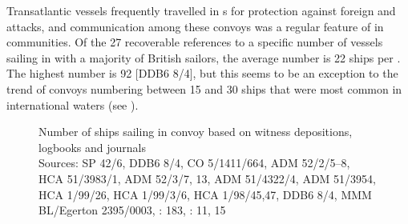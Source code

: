 Transatlantic vessels frequently travelled in s for protection against foreign and  attacks, and communication among these convoys was a regular feature of  in  communities. Of the 27 recoverable references to a specific number of vessels sailing in  with a majority of British sailors, the average number is 22 ships per . The highest number is 92 [DDB6 8/4], but this seems to be an exception to the trend of convoys numbering between 15 and 30 ships that were most common in international waters (see ). 

\begin{figure}
\caption{\label{fig:key:4.7} Number of ships sailing in convoy based on witness depositions, logbooks and journals\\
{\tiny
Sources: SP 42/6, DDB6 8/4, CO 5/1411/664, ADM 52/2/5–8, HCA 51/3983/1, ADM 52/3/7, 13, ADM 51/4322/4, ADM 51/3954, HCA 1/99/26, HCA 1/99/3/6, HCA 1/98/45,47, DDB6 8/4, MMM BL/Egerton 2395/0003, \citealt{Bicheno2012}: 183, \citealt{Gage1648}: 11, 15
}
}

\end{figure}

